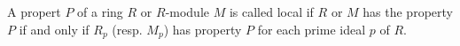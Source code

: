 A propert $P$ of a ring $R$ or $R$-module $M$ is called local if
$R$ or $M$ has the property $P$ if and only if $R_p$ (resp. $M_p$) has
property $P$ for each prime ideal $p$ of $R$.
